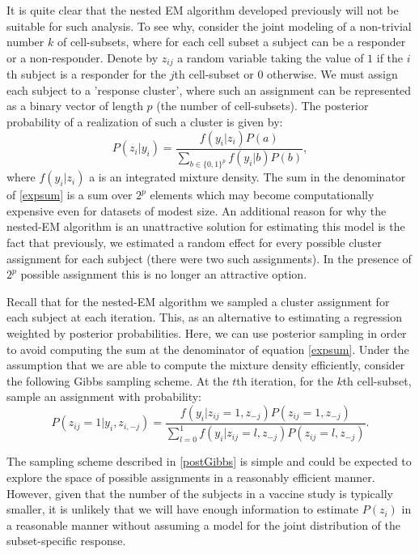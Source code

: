\documentclass{article}\usepackage[]{graphicx}\usepackage[]{color}
\begin{document}
It is quite clear that the nested EM algorithm developed previously will not be suitable for such analysis. To see why, consider the joint modeling of a non-trivial number $k$ of cell-subsets, where for each cell subset a subject can be a responder or a non-responder. Denote by $z_{ij}$ a random variable taking the value of $1$ if the $i$th subject is a responder for the $j$th cell-subset or $0$ otherwise. We must assign each subject to a 'response cluster', where such an assignment can be represented as a binary vector of length $p$ (the number of cell-subsets). The posterior probability of a realization of such a cluster is given by:
\begin{equation}\label{expsum}
P(z_{i} | y_{i}) = \frac{ f(y_i | z_{i}) P(a) }{ \sum_{ b \in \{0,1\}^{p}} f(y_i | b) P(b)},
\end{equation}
where $f(y_i | z_{i})$ a is an integrated mixture density. The sum in the denominator of \eqref{expsum} is a sum over $2^{p}$ elements which may become computationally expensive even for datasets of modest size. An additional reason for why the nested-EM algorithm is an unattractive solution for estimating this model is the fact that previously, we estimated a random effect for every possible cluster assignment for each subject (there were two such assignments). In the presence of $2^p$ possible assignment this is no longer an attractive option. 

Recall that for the nested-EM algorithm we sampled a cluster assignment for each subject at each iteration. This, as an alternative to estimating a regression weighted by posterior probabilities. Here, we can use posterior sampling in order to avoid computing the sum at the denominator of equation \eqref{expsum}. Under the assumption that we are able to compute the mixture density efficiently, consider the following Gibbs sampling scheme.  At the $t$th iteration, for the $k$th cell-subset, sample an assignment with probability:
\begin{equation}\label{postGibbs}
P(z_{ij} = 1 | y_i, z_{i,-j}) = 
\frac{f(y_i | z_{ij} = 1, z_{-j}) P( z_{ij} = 1, z_{-j})}
{\sum_{l=0}^{1} f(y_i | z_{ij} = l, z_{-j}) P( z_{ij} = l, z_{-j})}.
\end{equation}

The sampling scheme described in \eqref{postGibbs} is simple and could be expected to explore the space of possible assignments in a reasonably efficient manner. However, given that the number of the subjects in a vaccine study is typically smaller, it is unlikely that we will have enough information to estimate $P(z_{i})$ in a reasonable manner without assuming a model for the joint distribution of the subset-specific response. 
\end{document}
